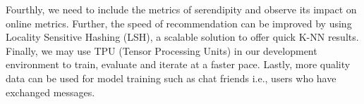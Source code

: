 \documentclass{kththesis}
\begin{document}
Fourthly, we need to include the metrics of serendipity and observe its impact on online metrics. Further, the speed of recommendation can be improved by using Locality Sensitive Hashing (LSH), a scalable solution to offer quick K-NN results. Finally, we may use TPU (Tensor Processing Units) in our development environment to train, evaluate and iterate at a faster pace. Lastly, more quality data can be used for model training such as chat friends i.e., users who have exchanged messages.

\printbibliography[heading=bibintoc]


\tailmatter
\end{document}
